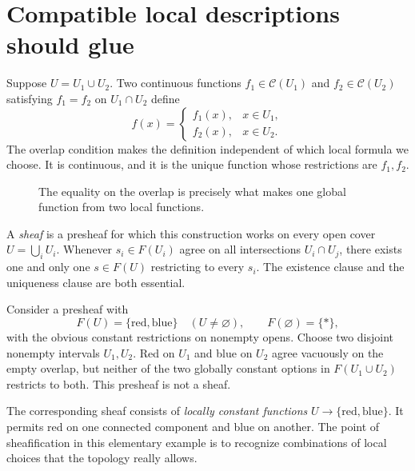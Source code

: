 \section{Compatible local descriptions should glue}

Suppose \(U=U_1\cup U_2\). Two continuous functions \(f_1\in\mathcal C(U_1)\) and \(f_2\in\mathcal C(U_2)\) satisfying \(f_1=f_2\) on \(U_1\cap U_2\) define
\[
 f(x)=
 \begin{cases}
 f_1(x),&x\in U_1,\\
 f_2(x),&x\in U_2.
 \end{cases}
\]
The overlap condition makes the definition independent of which local formula we choose. It is continuous, and it is the unique function whose restrictions are \(f_1,f_2\).

\begin{figure}[H]
\centering
{}
\caption{The equality on the overlap is precisely what makes one global function from two local functions.}
\end{figure}

A \emph{sheaf} is a presheaf for which this construction works on every open cover \(U=\bigcup_iU_i\). Whenever \(s_i\in F(U_i)\) agree on all intersections \(U_i\cap U_j\), there exists one and only one \(s\in F(U)\) restricting to every \(s_i\). The existence clause and the uniqueness clause are both essential.

Consider a presheaf with
\[
 F(U)=\{\text{red},\text{blue}\}
 \quad(U\ne\varnothing),\qquad F(\varnothing)=\{*\},
\]
with the obvious constant restrictions on nonempty opens. Choose two disjoint nonempty intervals \(U_1,U_2\). Red on \(U_1\) and blue on \(U_2\) agree vacuously on the empty overlap, but neither of the two globally constant options in \(F(U_1\cup U_2)\) restricts to both. This presheaf is not a sheaf.

The corresponding sheaf consists of \emph{locally constant functions} \(U\to\{\text{red},\text{blue}\}\). It permits red on one connected component and blue on another. The point of sheafification in this elementary example is to recognize combinations of local choices that the topology really allows.

